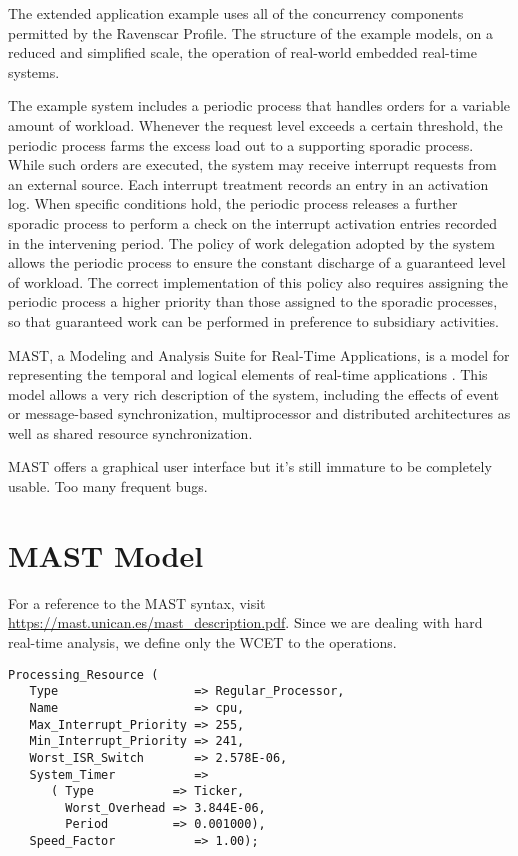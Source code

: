 \documentclass{article}
\begin{document}
The extended application example uses all of the concurrency components permitted by the Ravenscar Profile. The structure of the example models, on a reduced and simplified scale, the operation of real-world embedded real-time systems.

The example system includes a periodic process that handles orders for a variable amount of workload. Whenever the request level exceeds a certain threshold, the periodic process farms the excess load out to a supporting sporadic process. While such orders are executed, the system may receive interrupt requests from an external source. Each interrupt treatment records an entry in an activation log. When specific conditions hold, the periodic process releases a further sporadic process to perform a check on the interrupt activation entries recorded in the intervening period. The policy of work delegation adopted by the system allows the periodic process to ensure the constant discharge of a guaranteed level of workload. The correct implementation of this policy also requires assigning the periodic process a higher priority than those assigned to the sporadic processes, so that guaranteed work can be performed in preference to subsidiary activities.

MAST, a Modeling and Analysis Suite for Real-Time Applications, is a model for representing the temporal and logical elements of real-time applications \cite{mast}. This model allows a very rich description of the system, including the effects of event or message-based synchronization, multiprocessor and distributed architectures as well as shared resource synchronization.

MAST offers a graphical user interface but it's still immature to be completely usable. Too many frequent bugs.

\section{MAST Model}

For a reference to the MAST syntax, visit \url{https://mast.unican.es/mast_description.pdf}. Since we are dealing with hard real-time analysis, we define only the WCET to the operations.

\begin{lstlisting}
Processing_Resource (
   Type                   => Regular_Processor,
   Name                   => cpu,
   Max_Interrupt_Priority => 255,
   Min_Interrupt_Priority => 241,
   Worst_ISR_Switch       => 2.578E-06,
   System_Timer           =>
      ( Type           => Ticker,
        Worst_Overhead => 3.844E-06,
        Period         => 0.001000),
   Speed_Factor           => 1.00);
\end{lstlisting}
\end{document}
